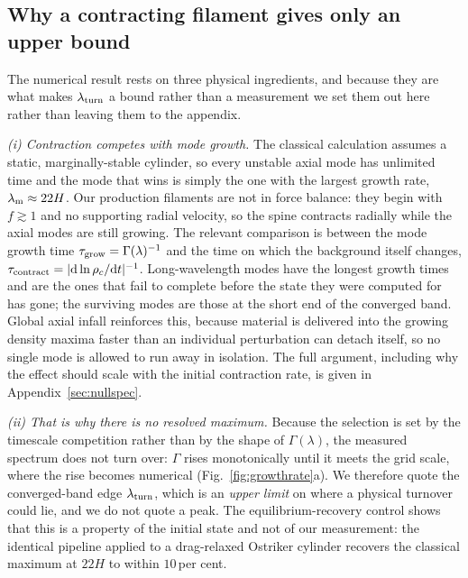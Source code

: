 \documentclass[usenatbib,twoside,twocolumn]{mnras}
\begin{document}
\subsection{Why a contracting filament gives only an upper bound}
\label{sec:whyupper}

The numerical result rests on three physical ingredients, and because they are what makes $\lambda_{\rm turn}$ a bound rather than a measurement we set them out here rather than leaving them to the appendix.

\smallskip\noindent\emph{(i) Contraction competes with mode growth.} The classical calculation assumes a static, marginally-stable cylinder, so every unstable axial mode has unlimited time and the mode that wins is simply the one with the largest growth rate, $\lambda_{\rm m}\approx22H$. Our production filaments are not in force balance: they begin with $f\gtrsim1$ and no supporting radial velocity, so the spine contracts radially while the axial modes are still growing. The relevant comparison is between the mode growth time $\tau_{\rm grow}=\Gamma(\lambda)^{-1}$ and the time on which the background itself changes, $\tau_{\rm contract}=|{\rm d}\ln\rho_c/{\rm d}t|^{-1}$. Long-wavelength modes have the longest growth times and are the ones that fail to complete before the state they were computed for has gone; the surviving modes are those at the short end of the converged band. Global axial infall reinforces this, because material is delivered into the growing density maxima faster than an individual perturbation can detach itself, so no single mode is allowed to run away in isolation. The full argument, including why the effect should scale with the initial contraction rate, is given in Appendix~\ref{sec:nullspec}.

\smallskip\noindent\emph{(ii) That is why there is no resolved maximum.} Because the selection is set by the timescale competition rather than by the shape of $\Gamma(\lambda)$, the measured spectrum does not turn over: $\Gamma$ rises monotonically until it meets the grid scale, where the rise becomes numerical (Fig.~\ref{fig:growthrate}a). We therefore quote the converged-band edge $\lambda_{\rm turn}$, which is an \emph{upper limit} on where a physical turnover could lie, and we do not quote a peak. The equilibrium-recovery control shows that this is a property of the initial state and not of our measurement: the identical pipeline applied to a drag-relaxed Ostriker cylinder recovers the classical maximum at $22H$ to within $10$\,per cent.
\end{document}
